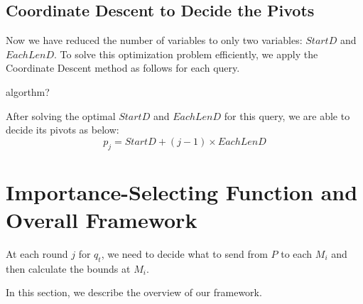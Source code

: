 \subsection{Coordinate Descent to Decide the Pivots} %
\label{ss:coordinate_descent_to_decide_the_pivots}

Now we have reduced the number of variables to only two variables: $StartD$ and $EachLenD$. To solve this optimization problem efficiently, we apply the Coordinate Descent method as follows for each query.

algorthm?

After solving the optimal $StartD$ and $EachLenD$ for this query, we are able to decide its pivots as below:
\begin{equation}
	p_j = StartD + (j-1)\times EachLenD	
\end{equation}



\section{Importance-Selecting Function and Overall Framework} %
\label{s:importance_selecting_function_and_overall_framework}
At each round $j$ for $q_t$, we need to decide what to send from $P$ to each $M_i$ and then calculate the bounds at $M_i$. 

In this section, we describe the overview of our framework.




%
